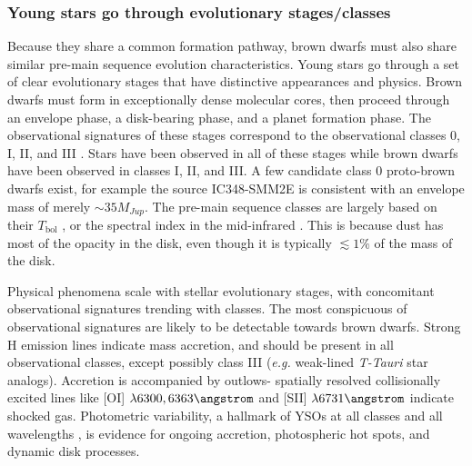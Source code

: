 \subsubsection{Young stars go through evolutionary stages/classes}
Because they share a common formation pathway, brown dwarfs must also share similar pre-main sequence evolution characteristics.  Young stars go through a set of clear evolutionary stages that have distinctive appearances and physics.  Brown dwarfs must form in exceptionally dense molecular cores, then proceed through an envelope phase, a disk-bearing phase, and a planet formation phase.  The observational signatures of these stages correspond to the observational classes 0, I, II, and III \citep{1987ApJ...312..788A}.  Stars have been observed in all of these stages \citep{2014prpl.conf..195D} while brown dwarfs have been observed in classes I, II, and III.  A few candidate class 0 proto-brown dwarfs exist\citep{2012Sci...337...69A,2014A&A...564A..32P,2014MNRAS.444..833P}, for example the source IC348-SMM2E is consistent with an envelope mass of merely $\sim35 M_{Jup}$.  The pre-main sequence classes are largely based on their $T_{\mathrm{bol}}$ \citep{1993ApJ...413L..47M}, or the spectral index in the mid-infrared \citep{1984ApJ...287..610L}.  This is because dust has most of the opacity in the disk, even though it is typically $\lesssim1\%$ of the mass of the disk.  

Physical phenomena scale with stellar evolutionary stages, with concomitant observational signatures trending with classes.  The most conspicuous of observational signatures are likely to be detectable towards brown dwarfs.  Strong H emission lines indicate mass accretion, and should be present in all observational classes, except possibly class III (\emph{e.g.} weak-lined \emph{T-Tauri} star analogs).  Accretion is accompanied by outlows- spatially resolved collisionally excited lines like [OI] $\lambda 6300, 6363 \angstrom$ and [SII] $\lambda 6731 \angstrom$ \citep{2005Natur.435..652W} indicate shocked gas.  Photometric variability, a hallmark of YSOs at all classes and all wavelengths \citep{2014AJ....148...92R,2014AJ....147...82C}, is evidence for ongoing accretion, photospheric hot spots, and dynamic disk processes.


